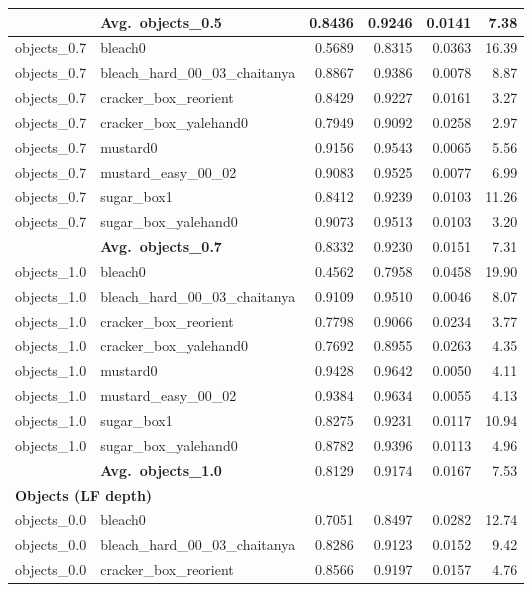 \begin{longtable}{llrrrr}
  & \textbf{Avg.~objects_0.5} & 0.8436 & 0.9246 & 0.0141 & 7.38 \\
  \midrule
  objects_0.7 & bleach0 & 0.5689 & 0.8315 & 0.0363 & 16.39 \\
  objects_0.7 & bleach\_hard\_00\_03\_chaitanya & 0.8867 & 0.9386 & 0.0078 & 8.87 \\
  objects_0.7 & cracker\_box\_reorient & 0.8429 & 0.9227 & 0.0161 & 3.27 \\
  objects_0.7 & cracker\_box\_yalehand0 & 0.7949 & 0.9092 & 0.0258 & 2.97 \\
  objects_0.7 & mustard0 & 0.9156 & 0.9543 & 0.0065 & 5.56 \\
  objects_0.7 & mustard\_easy\_00\_02 & 0.9083 & 0.9525 & 0.0077 & 6.99 \\
  objects_0.7 & sugar\_box1 & 0.8412 & 0.9239 & 0.0103 & 11.26 \\
  objects_0.7 & sugar\_box\_yalehand0 & 0.9073 & 0.9513 & 0.0103 & 3.20 \\
  \cmidrule{2-6}
  & \textbf{Avg.~objects_0.7} & 0.8332 & 0.9230 & 0.0151 & 7.31 \\
  \midrule
  objects_1.0 & bleach0 & 0.4562 & 0.7958 & 0.0458 & 19.90 \\
  objects_1.0 & bleach\_hard\_00\_03\_chaitanya & 0.9109 & 0.9510 & 0.0046 & 8.07 \\
  objects_1.0 & cracker\_box\_reorient & 0.7798 & 0.9066 & 0.0234 & 3.77 \\
  objects_1.0 & cracker\_box\_yalehand0 & 0.7692 & 0.8955 & 0.0263 & 4.35 \\
  objects_1.0 & mustard0 & 0.9428 & 0.9642 & 0.0050 & 4.11 \\
  objects_1.0 & mustard\_easy\_00\_02 & 0.9384 & 0.9634 & 0.0055 & 4.13 \\
  objects_1.0 & sugar\_box1 & 0.8275 & 0.9231 & 0.0117 & 10.94 \\
  objects_1.0 & sugar\_box\_yalehand0 & 0.8782 & 0.9396 & 0.0113 & 4.96 \\
  \cmidrule{2-6}
  & \textbf{Avg.~objects_1.0} & 0.8129 & 0.9174 & 0.0167 & 7.53 \\
  \midrule
\multicolumn{6}{l}{\textbf{Objects (LF depth)}} \\
\midrule
  objects_0.0 & bleach0 & 0.7051 & 0.8497 & 0.0282 & 12.74 \\
  objects_0.0 & bleach\_hard\_00\_03\_chaitanya & 0.8286 & 0.9123 & 0.0152 & 9.42 \\
  objects_0.0 & cracker\_box\_reorient & 0.8566 & 0.9197 & 0.0157 & 4.76 \\

\end{longtable}
